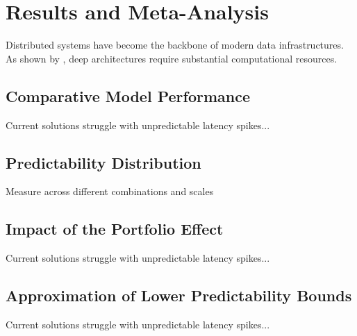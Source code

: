 \chapter{Results and Meta-Analysis}
\label{chap:results}

Distributed systems have become the backbone of modern data infrastructures. As shown by \textcite{vaswani2017attention}, deep architectures require substantial computational resources.


\section{Comparative Model Performance}
\label{sec:comparativePerformance}

Current solutions struggle with unpredictable latency spikes...


\section{Predictability Distribution}
\label{sec:predictabilityDistribution}

Measure across different combinations and scales


\section{Impact of the Portfolio Effect}
\label{sec:portfolioEffect}

Current solutions struggle with unpredictable latency spikes...


\section{Approximation of Lower Predictability Bounds}
\label{sec:predictabiltyBounds}

Current solutions struggle with unpredictable latency spikes...